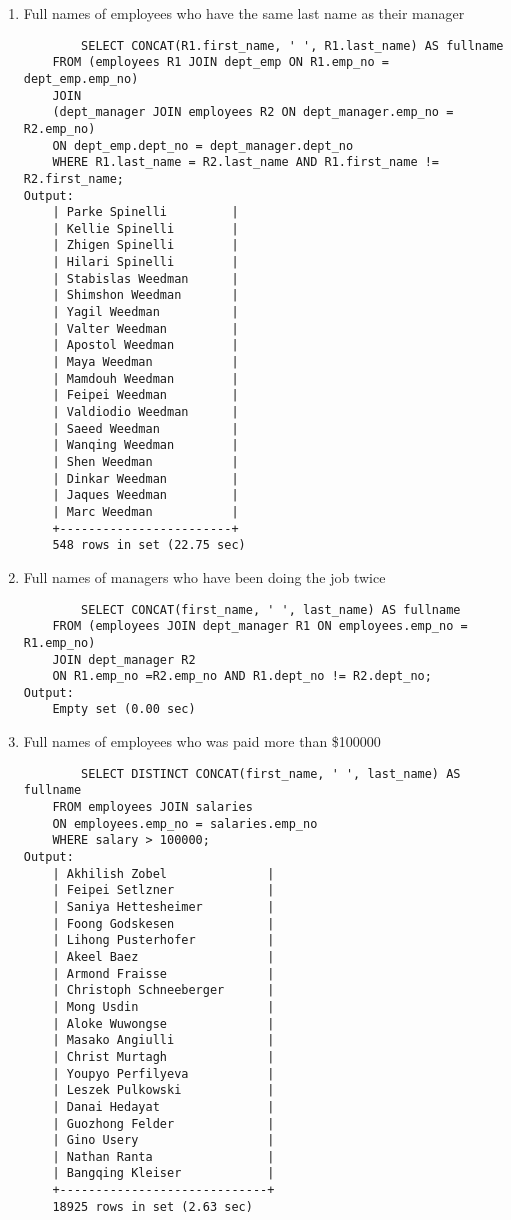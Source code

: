 \documentclass[12pt, letterpaper, twoside]{article}
\begin{document}
\begin{enumerate}
		\item Full names of employees who have the same last name as
their manager
		\begin{verbatim}
		SELECT CONCAT(R1.first_name, ' ', R1.last_name) AS fullname
	FROM (employees R1 JOIN dept_emp ON R1.emp_no = dept_emp.emp_no)
	JOIN 
	(dept_manager JOIN employees R2 ON dept_manager.emp_no = R2.emp_no)
	ON dept_emp.dept_no = dept_manager.dept_no
	WHERE R1.last_name = R2.last_name AND R1.first_name != R2.first_name;
Output:
	| Parke Spinelli         |
	| Kellie Spinelli        |
	| Zhigen Spinelli        |
	| Hilari Spinelli        |
	| Stabislas Weedman      |
	| Shimshon Weedman       |
	| Yagil Weedman          |
	| Valter Weedman         |
	| Apostol Weedman        |
	| Maya Weedman           |
	| Mamdouh Weedman        |
	| Feipei Weedman         |
	| Valdiodio Weedman      |
	| Saeed Weedman          |
	| Wanqing Weedman        |
	| Shen Weedman           |
	| Dinkar Weedman         |
	| Jaques Weedman         |
	| Marc Weedman           |
	+------------------------+
	548 rows in set (22.75 sec)
		\end{verbatim}
		
		\item Full names of managers who have been doing the job twice
		\begin{verbatim}
		SELECT CONCAT(first_name, ' ', last_name) AS fullname
	FROM (employees JOIN dept_manager R1 ON employees.emp_no = R1.emp_no)
	JOIN dept_manager R2
	ON R1.emp_no =R2.emp_no AND R1.dept_no != R2.dept_no;
Output:
	Empty set (0.00 sec)
		\end{verbatim}
		
		\item Full names of employees who was paid more than \$100000
		\begin{verbatim}
		SELECT DISTINCT CONCAT(first_name, ' ', last_name) AS fullname
	FROM employees JOIN salaries
	ON employees.emp_no = salaries.emp_no
	WHERE salary > 100000;
Output:
	| Akhilish Zobel              |
	| Feipei Setlzner             |
	| Saniya Hettesheimer         |
	| Foong Godskesen             |
	| Lihong Pusterhofer          |
	| Akeel Baez                  |
	| Armond Fraisse              |
	| Christoph Schneeberger      |
	| Mong Usdin                  |
	| Aloke Wuwongse              |
	| Masako Angiulli             |
	| Christ Murtagh              |
	| Youpyo Perfilyeva           |
	| Leszek Pulkowski            |
	| Danai Hedayat               |
	| Guozhong Felder             |
	| Gino Usery                  |
	| Nathan Ranta                |
	| Bangqing Kleiser            |
	+-----------------------------+
	18925 rows in set (2.63 sec)
		\end{verbatim}
		

\end{enumerate}
\end{document}
